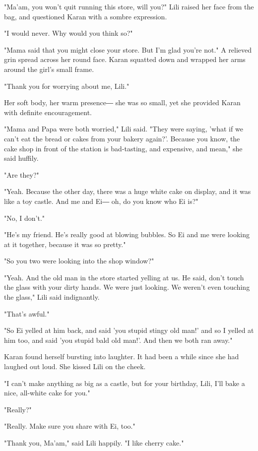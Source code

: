 "Ma'am, you won't quit running this store, will you?" Lili raised her
face from the bag, and questioned Karan with a sombre expression.

"I would never. Why would you think so?"

"Mama said that you might close your store. But I'm glad you're not." A
relieved grin spread across her round face. Karan squatted down and
wrapped her arms around the girl's small frame.

"Thank you for worrying about me, Lili."

Her soft body, her warm presence― she was so small, yet she provided
Karan with definite encouragement.

"Mama and Papa were both worried," Lili said. "They were saying, 'what
if we can't eat the bread or cakes from your bakery again?'. Because you
know, the cake shop in front of the station is bad-tasting, and
expensive, and mean," she said huffily.

"Are they?"

"Yeah. Because the other day, there was a huge white cake on display,
and it was like a toy castle. And me and Ei― oh, do you know who Ei is?"

"No, I don't."

"He's my friend. He's really good at blowing bubbles. So Ei and me were
looking at it together, because it was so pretty."

"So you two were looking into the shop window?"

"Yeah. And the old man in the store started yelling at us. He said,
don't touch the glass with your dirty hands. We were just looking. We
weren't even touching the glass," Lili said indignantly.

"That's awful."

"So Ei yelled at him back, and said 'you stupid stingy old man!' and so
I yelled at him too, and said 'you stupid bald old man!'. And then we
both ran away."

Karan found herself bursting into laughter. It had been a while since
she had laughed out loud. She kissed Lili on the cheek.

"I can't make anything as big as a castle, but for your birthday, Lili,
I'll bake a nice, all-white cake for you."

"Really?"

"Really. Make sure you share with Ei, too."

"Thank you, Ma'am," said Lili happily. "I like cherry cake."

